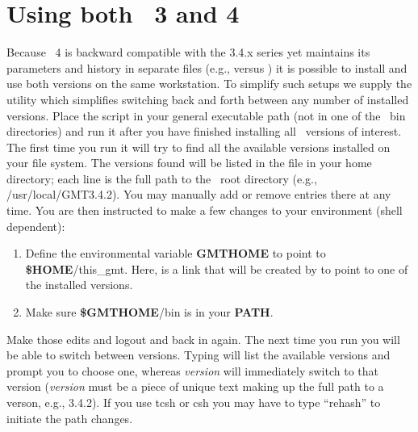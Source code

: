 %
%

\chapter{Using both \gmt\ 3 and 4}
\thispagestyle{headings}

Because \GMT\ 4 is backward compatible with the 3.4.x series yet maintains its parameters
and history in separate files (e.g.,  versus )
it is possible to install and use both versions on the same workstation.  To simplify such
setups we supply the utility  which simplifies switching back and forth
between any number of installed versions.  Place the  script in your
general executable path (not in one of the \GMT\ bin directories) and run it after you have
finished installing all \GMT\ versions of interest.  The first time you run 
it will try to find all the available versions installed on your file system.  The versions
found will be listed in the file  in your home directory; each line
is the full path to the \GMT\ root directory (e.g., /usr/local/GMT3.4.2).  You may
manually add or remove entries there at any time.  You are then instructed to make a few
changes to your environment (shell dependent):
\begin{enumerate}
\item Define the environmental variable {\bf GMTHOME} to point to {\bf \$HOME}/this\_gmt.
Here,  is a link that will be created by  to point
to one of the installed versions. 
\item Make sure {\bf \$GMTHOME}/bin is in your {\bf PATH}.
\end{enumerate}
Make those edits and logout and back in again.  The next time you run 
you will be able to switch between versions.  Typing  will list the
available versions and prompt you to choose one, whereas  {\it version}
will immediately switch to that version ({\it version} must be a piece of unique text making
up the full path to a verson, e.g., 3.4.2).  If you use tcsh or csh you may have to type
``rehash'' to initiate the path changes.
